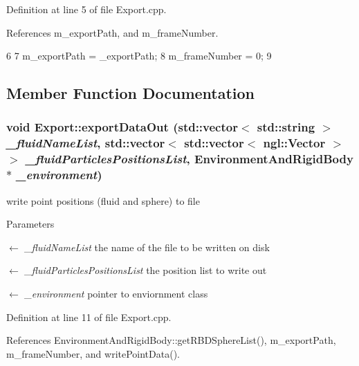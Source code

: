 Definition at line 5 of file Export.cpp.



References m\_\-exportPath, and m\_\-frameNumber.




\begin{DoxyCode}
6 {
7     m_exportPath = _exportPath;
8     m_frameNumber = 0;
9 }
\end{DoxyCode}




\subsection{Member Function Documentation}
\hypertarget{class_export_ae3981dfddf020b1da5b91e344247977b}{
\subsubsection[{exportDataOut}]{\setlength{\rightskip}{0pt plus 5cm}void Export::exportDataOut (std::vector$<$ std::string $>$ {\em \_\-fluidNameList}, \/  std::vector$<$ std::vector$<$ ngl::Vector $>$ $>$ {\em \_\-fluidParticlesPositionsList}, \/  {\bf EnvironmentAndRigidBody} $\ast$ {\em \_\-environment})}}
\label{class_export_ae3981dfddf020b1da5b91e344247977b}


write point positions (fluid and sphere) to file 


\begin{DoxyParams}{Parameters}
\item[\mbox{$\leftarrow$} {\em \_\-fluidNameList}]the name of the file to be written on disk \item[\mbox{$\leftarrow$} {\em \_\-fluidParticlesPositionsList}]the position list to write out \item[\mbox{$\leftarrow$} {\em \_\-environment}]pointer to enviornment class \end{DoxyParams}


Definition at line 11 of file Export.cpp.



References EnvironmentAndRigidBody::getRBDSphereList(), m\_\-exportPath, m\_\-frameNumber, and writePointData().




